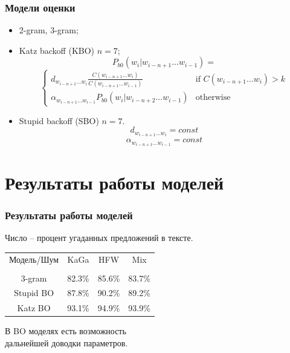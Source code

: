 \documentclass[14pt]{beamer}
\begin{document}
\begin{frame}
	\frametitle{Модели оценки}

\begin{itemize}
	\item 2-gram, 3-gram;
	\item Katz backoff (KBO) $n = 7$;
	\small
	\begin{equation*}
	P_{b0}\left( w_i | w_{i-n+1}...w_{i-1} \right) = 
	\end{equation*}
	\begin{equation*}
	\begin{cases}
	d_{w_{i-n+1}...w_i} \frac{C(w_{i-n+1}...w_i)}{C(w_{i-n+1}...w_{i-1})} &\text{if $C(w_{i-n+1}...w_i) > k$}\\
	\alpha_{w_{i-n+1}...w_{i-1}} P_{b0}\left( w_i | w_{i-n+2}...w_{i-1} \right) &\text{otherwise}
	\end{cases}
	\end{equation*}
	\item Stupid backoff (SBO) $n = 7$.
	$$ d_{w_{i-n+1}...w_i} = const $$
	$$ \alpha_{w_{i-n+1}...w_{i-1}} = const $$ 
\end{itemize}
\end{frame}

\section{Результаты работы моделей}

\begin{frame}
	\frametitle{Результаты работы моделей}
	Число -- процент угаданных предложений в тексте.

\begin{center}
	\begin{tabular}{c||c|c|c}
		Модель/Шум & KaGa 		& HFW 		& Mix \\
		\hrulefill & \hrulefill & \hrulefill& \hrulefill \\
		3-gram 	   &	82.3\%		&	85.6\%		&	83.7\%		\\
		Stupid BO  &	87.8\%		&	90.2\%		&	89.2\%		\\
		Katz BO    &	93.1\%		&	94.9\%		&		93.9\%	\\
		
	\end{tabular}
\end{center}	

В BO моделях есть возможность \\дальнейшей доводки параметров.
\end{frame}
\end{document}
